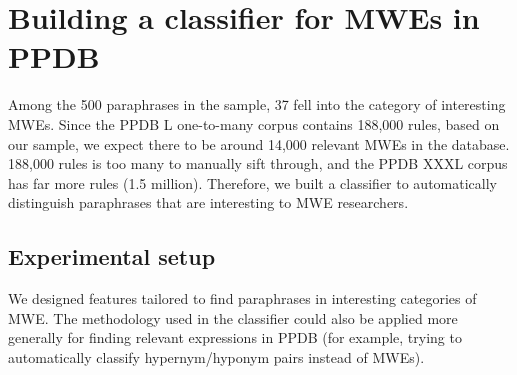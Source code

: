 \documentclass[11pt]{article}
\begin{document}
%
%



\section{Building a classifier for MWEs in PPDB}


Among the 500 paraphrases in the sample, 37 fell into the category of interesting MWEs. Since the PPDB L one-to-many corpus contains 188,000 rules, based on our sample, we expect there to be around 14,000 relevant MWEs in the database. 188,000 rules is too many to manually sift through, and the PPDB XXXL corpus has far more rules (1.5 million). Therefore, we built a classifier to automatically distinguish paraphrases that are interesting to MWE researchers.

\subsection{Experimental setup}

We designed features tailored to find paraphrases in interesting categories of MWE. The methodology used in the classifier could also be applied more generally for finding relevant expressions in PPDB (for example, trying to automatically classify hypernym/hyponym pairs instead of MWEs).
\end{document}
